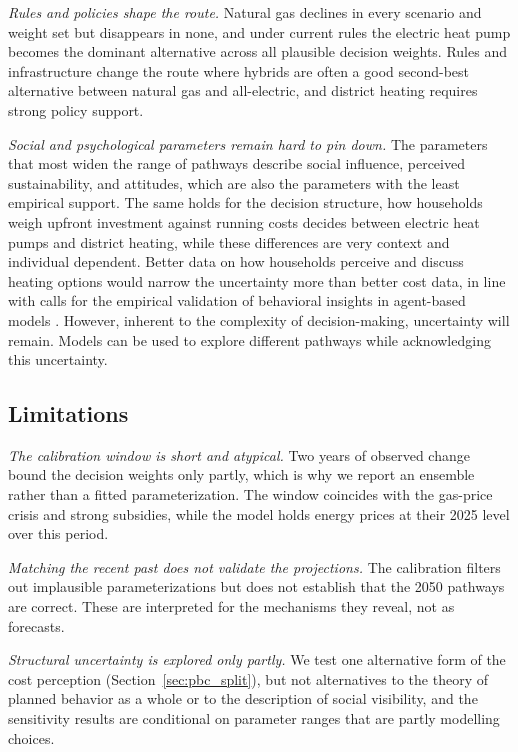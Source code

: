 \documentclass[preprint,12pt,authoryear]{elsarticle}
\begin{document}
\emph{Rules and policies shape the route.} Natural gas declines in every
scenario and weight set but disappears in none, and under current rules the
electric heat pump becomes the dominant alternative across all plausible
decision weights. Rules and infrastructure change the route where hybrids
are often a good second-best alternative between natural gas and all-electric, 
and district heating requires strong policy support.

\emph{Social and psychological parameters remain hard to pin down.} The
parameters that most widen the range of pathways describe social influence,
perceived sustainability, and attitudes, which are also the parameters with
the least empirical support. The same holds for the decision structure, how
households weigh upfront investment against running costs decides between
electric heat pumps and district heating, while these differences are very
context and individual dependent. Better data on how households perceive and discuss heating
options would narrow the uncertainty more than better cost data, in line
with calls for the empirical validation of behavioral insights in agent-based
models \citep{rietkerkBridgingBehavioralTheory2025}. However, inherent to the
complexity of decision-making, uncertainty will remain. Models can be used to
explore different pathways while acknowledging this uncertainty.

\subsection{Limitations}
\label{sec:limitations}

\emph{The calibration window is short and atypical.} Two years of observed
change bound the decision weights only partly, which is why we report an
ensemble rather than a fitted parameterization. The window coincides with the
gas-price crisis and strong subsidies, while the model holds energy prices at
their 2025 level over this period.

\emph{Matching the recent past does not validate the projections.} The
calibration filters out implausible parameterizations but does not establish
that the 2050 pathways are correct. These are interpreted for the mechanisms
they reveal, not as forecasts.

\emph{Structural uncertainty is explored only partly.} We test one
alternative form of the cost perception (Section~\ref{sec:pbc_split}), but
not alternatives to the theory of planned behavior as a whole or to the
description of social visibility, and the sensitivity results are conditional
on parameter ranges that are partly modelling choices.
\end{document}
